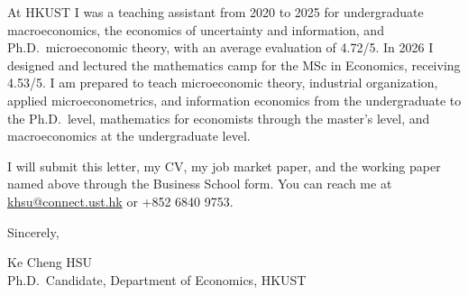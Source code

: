 \documentclass[11pt]{article}
\begin{document}
At HKUST I was a teaching assistant from 2020 to 2025 for undergraduate macroeconomics, the economics of uncertainty and information, and Ph.D.\ microeconomic theory, with an average evaluation of 4.72/5. In 2026 I designed and lectured the mathematics camp for the MSc in Economics, receiving 4.53/5. I am prepared to teach microeconomic theory, industrial organization, applied microeconometrics, and information economics from the undergraduate to the Ph.D.\ level, mathematics for economists through the master's level, and macroeconomics at the undergraduate level.

I will submit this letter, my CV, my job market paper, and the working paper named above through the Business School form. You can reach me at \href{mailto:khsu@connect.ust.hk}{khsu@connect.ust.hk} or +852 6840 9753.

\vspace{0.2em}
Sincerely,

\vspace{0.2em}
Ke Cheng HSU \\
Ph.D.\ Candidate, Department of Economics, HKUST
\end{document}
